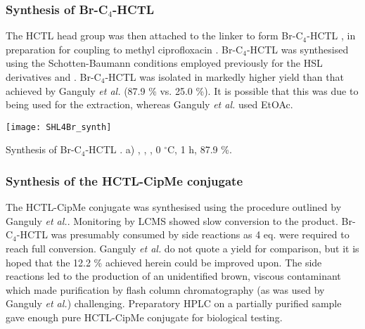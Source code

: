 \subsubsection{Synthesis of Br-C$_4$-HCTL }

The HCTL head group was then attached to the linker to form Br-C$_4$-HCTL , in preparation for coupling to methyl ciprofloxacin .
Br-C$_4$-HCTL  was synthesised using the Schotten-Baumann conditions employed previously for the HSL derivatives  and . Br-C$_4$-HCTL  was isolated in markedly higher yield than that achieved by Ganguly \textit{et al.}\cite{Ganguly2011} (87.9 \% vs. 25.0 \%). It is possible that this was due to  being used for the extraction, whereas Ganguly \textit{et al.} used EtOAc.

\begin{scheme}[H]
	\begin{center}
		\texttt{[image: SHL4Br\_synth]}
		\caption{Synthesis of Br-C$_4$-HCTL . a) , , , 0 $^{\circ}$C, 1 h, 87.9 \%.\label{sch:SHL4Br_synth}}
	\end{center}
\end{scheme}

\subsubsection{Synthesis of the HCTL-CipMe conjugate }

The HCTL-CipMe conjugate  was synthesised using the procedure outlined by Ganguly \textit{et al.}\cite{Ganguly2011}. Monitoring by LCMS showed slow conversion to the product. Br-C$_4$-HCTL  was presumably consumed by side reactions as 4 eq. were required to reach full conversion. Ganguly \textit{et al.} do not quote a yield for comparison\cite{Ganguly2011}\cite{Iyer2012}, but it is hoped that the 12.2 \% achieved herein could be improved upon. The side reactions led to the production of an unidentified brown, viscous contaminant which made purification by flash column chromatography (as was used by Ganguly \textit{et al.}) challenging. Preparatory HPLC on a partially purified sample gave enough pure HCTL-CipMe conjugate  for biological testing. 

